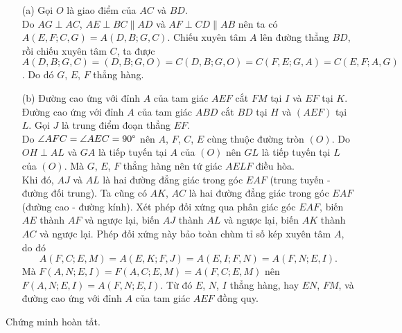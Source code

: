         \begin{solution}
            \hfill
            \begin{enumerate}
                \item[(a)] Gọi \(O\) là giao điểm của \(AC\) và \(BD\).\\
                Do \(AG \perp AC\), \(AE \perp BC \parallel AD\) và \(AF \perp CD \parallel AB\) nên ta có \(A(E,F;C,G) = A(D,B;G,C)\). Chiếu xuyên tâm \(A\) lên đường thẳng \(BD\), rồi chiếu xuyên tâm \(C\), ta được \(A(D,B;G,C) = (D,B;G,O) = C(D,B;G,O) = C(F,E;G,A) = C(E,F;A,G)\). Do đó \(G\), \(E\), \(F\) thẳng hàng.
                \item[(b)] Đường cao ứng với đỉnh \(A\) của tam giác \(AEF\) cắt \(FM\) tại \(I\) và \(EF\) tại \(K\). Đường cao ứng với đỉnh \(A\) của tam giác \(ABD\) cắt \(BD\) tại \(H\) và \((AEF)\) tại \(L\). Gọi \(J\) là trung điểm đoạn thẳng \(EF\).\\
                Do \(\angle AFC = \angle AEC = 90 \degree\) nên \(A\), \(F\), \(C\), \(E\) cùng thuộc đường tròn \((O)\). Do \(OH \perp AL\) và \(GA\) là tiếp tuyến tại \(A\) của \((O)\) nên \(GL\) là tiếp tuyến tại \(L\) của \((O)\). Mà \(G\), \(E\), \(F\) thẳng hàng nên tứ giác \(AELF\) điều hòa.\\
                Khi đó, \(AJ\) và \(AL\) là hai đường đẳng giác trong góc \(EAF\) (trung tuyến - đường đối trung). Ta cũng có \(AK\), \(AC\) là hai đường đẳng giác trong góc \(EAF\) (đường cao - đường kính). Xét phép đối xứng qua phân giác góc \(EAF\), biến \(AE\) thành \(AF\) và ngược lại, biến \(AJ\) thành \(AL\) và ngược lại, biến \(AK\) thành \(AC\) và ngược lại. Phép đối xứng này bảo toàn chùm tỉ số kép xuyên tâm \(A\), do đó
                \[A(F,C;E,M) = A(E,K;F,J) = A(E,I;F,N) = A(F,N;E,I).\]
                Mà \(F(A,N;E,I) = F(A,C;E,M) = A(F,C;E,M)\) nên \(F(A,N;E,I) = A(F,N;E,I)\). Từ đó \(E\), \(N\), \(I\) thẳng hàng, hay \(EN\), \(FM\), và đường cao ứng với đỉnh \(A\) của tam giác \(AEF\) đồng quy.
            \end{enumerate}
            Chứng minh hoàn tất.
        \end{solution}